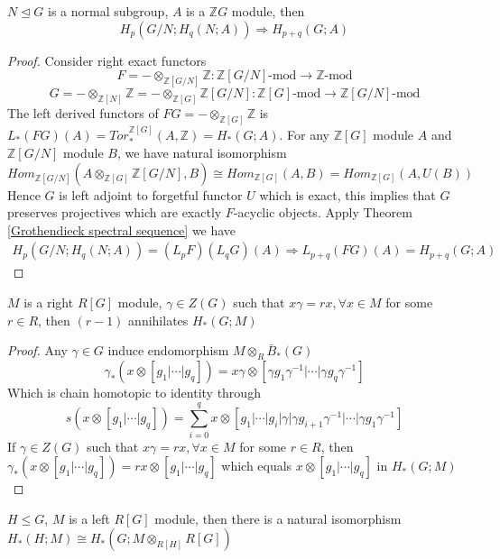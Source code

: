\documentclass[../main.tex]{subfiles}
\begin{document}
\begin{corollary}\label{Hochschild-Serre spectral sequence}
$N\trianglelefteq G$ is a normal subgroup, $A$ is a $\mathbb ZG$ module, then
\[H_p(G/N;H_q(N;A))\Rightarrow H_{p+q}(G;A)\]
\end{corollary}

\begin{proof}
Consider right exact functors
\[F=-\otimes_{\mathbb Z[G/N]}\mathbb Z:\mathbb Z[G/N]\text{-mod}\to\mathbb Z\text{-mod}\]
\[G=-\otimes_{\mathbb Z[N]}\mathbb Z=-\otimes_{\mathbb Z[G]}\mathbb Z[G/N]:\mathbb Z[G]\text{-mod}\to\mathbb Z[G/N]\text{-mod}\]
The left derived functors of $FG=-\otimes_{\mathbb Z[G]}\mathbb Z$ is $L_*(FG)(A)=Tor_*^{\mathbb Z[G]}(A,\mathbb Z)=H_*(G;A)$. For any $\mathbb Z[G]$ module $A$ and $\mathbb Z[G/N]$ module $B$, we have natural isomorphism
\[Hom_{\mathbb Z[G/N]}(A\otimes_{\mathbb Z[G]}\mathbb Z[G/N],B)\cong Hom_{\mathbb Z[G]}(A,B)=Hom_{\mathbb Z[G]}(A,U(B))\]
Hence $G$ is left adjoint to forgetful functor $U$ which is exact, this implies that $G$ preserves projectives which are exactly $F$-acyclic objects. Apply Theorem \ref{Grothendieck spectral sequence} we have
\begin{align*}
H_p(G/N;H_q(N;A))=(L_pF)(L_qG)(A)\Rightarrow L_{p+q}(FG)(A)=H_{p+q}(G;A)
\end{align*}
\end{proof}

\begin{lemma}\label{Center kills lemma}
$M$ is a right $R[G]$ module, $\gamma\in Z(G)$ such that $x\gamma=rx,\forall x\in M$ for some $r\in R$, then $(r-1)$ annihilates $H_*(G;M)$
\end{lemma}

\begin{proof}
Any $\gamma\in G$ induce endomorphism $M\otimes_R\bar B_*(G)$
\[\gamma_*(x\otimes[g_1|\cdots|g_q])=x\gamma\otimes[\gamma g_1\gamma^{-1}|\cdots|\gamma g_q\gamma^{-1}]\]
Which is chain homotopic to identity through
\[s(x\otimes[g_1|\cdots|g_q])=\sum_{i=0}^qx\otimes[g_1|\cdots|g_i|\gamma|\gamma g_{i+1}\gamma^{-1}|\cdots|\gamma g_1\gamma^{-1}]\]
If $\gamma\in Z(G)$ such that $x\gamma=rx,\forall x\in M$ for some $r\in R$, then $\gamma_*(x\otimes[g_1|\cdots|g_q])=rx\otimes[ g_1|\cdots| g_q]$ which equals $x\otimes[g_1|\cdots|g_q]$ in $H_*(G;M)$
\end{proof}

\begin{lemma}\label{Shapiro's lemma}
$H\leq G$, $M$ is a left $R[G]$ module, then there is a natural isomorphism $H_*(H;M)\cong H_*(G;M\otimes_{R[H]}R[G])$
\end{lemma}
\end{document}
